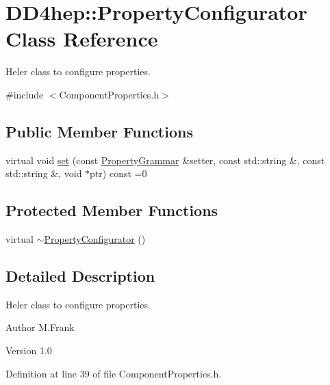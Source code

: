 \hypertarget{class_d_d4hep_1_1_property_configurator}{
\section{DD4hep::PropertyConfigurator Class Reference}
\label{class_d_d4hep_1_1_property_configurator}
}


Heler class to configure properties.  


{\ttfamily \#include $<$ComponentProperties.h$>$}\subsection*{Public Member Functions}
\begin{DoxyCompactItemize}
\item 
virtual void \hyperlink{class_d_d4hep_1_1_property_configurator_a863dbbfed205e1a74c7e81dd1375843f}{set} (const \hyperlink{class_d_d4hep_1_1_property_grammar}{PropertyGrammar} \&setter, const std::string \&, const std::string \&, void $\ast$ptr) const =0
\end{DoxyCompactItemize}
\subsection*{Protected Member Functions}
\begin{DoxyCompactItemize}
\item 
virtual \hyperlink{class_d_d4hep_1_1_property_configurator_ab634d5cb9b04f998d49465b8fb5aa507}{$\sim$PropertyConfigurator} ()
\end{DoxyCompactItemize}


\subsection{Detailed Description}
Heler class to configure properties. \begin{DoxyAuthor}{Author}
M.Frank 
\end{DoxyAuthor}
\begin{DoxyVersion}{Version}
1.0 
\end{DoxyVersion}


Definition at line 39 of file ComponentProperties.h.

